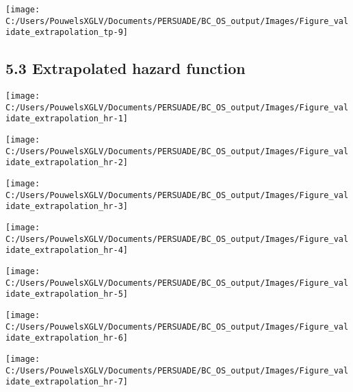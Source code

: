 \documentclass[
]{article}
\begin{document}
\begin{flushleft}\texttt{[image: C:/Users/PouwelsXGLV/Documents/PERSUADE/BC\_OS\_output/Images/Figure\_validate\_extrapolation\_tp-9]} \end{flushleft}

\clearpage

\subsection{5.3 Extrapolated hazard
function}\label{extrapolated-hazard-function}

\begin{flushleft}\texttt{[image: C:/Users/PouwelsXGLV/Documents/PERSUADE/BC\_OS\_output/Images/Figure\_validate\_extrapolation\_hr-1]} \end{flushleft}

\begin{flushleft}\texttt{[image: C:/Users/PouwelsXGLV/Documents/PERSUADE/BC\_OS\_output/Images/Figure\_validate\_extrapolation\_hr-2]} \end{flushleft}

\begin{flushleft}\texttt{[image: C:/Users/PouwelsXGLV/Documents/PERSUADE/BC\_OS\_output/Images/Figure\_validate\_extrapolation\_hr-3]} \end{flushleft}

\begin{flushleft}\texttt{[image: C:/Users/PouwelsXGLV/Documents/PERSUADE/BC\_OS\_output/Images/Figure\_validate\_extrapolation\_hr-4]} \end{flushleft}

\begin{flushleft}\texttt{[image: C:/Users/PouwelsXGLV/Documents/PERSUADE/BC\_OS\_output/Images/Figure\_validate\_extrapolation\_hr-5]} \end{flushleft}

\begin{flushleft}\texttt{[image: C:/Users/PouwelsXGLV/Documents/PERSUADE/BC\_OS\_output/Images/Figure\_validate\_extrapolation\_hr-6]} \end{flushleft}

\begin{flushleft}\texttt{[image: C:/Users/PouwelsXGLV/Documents/PERSUADE/BC\_OS\_output/Images/Figure\_validate\_extrapolation\_hr-7]} \end{flushleft}
\end{document}
